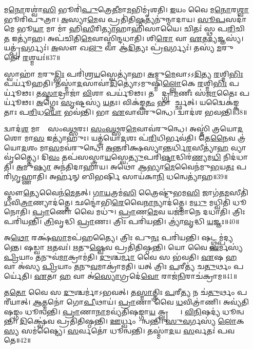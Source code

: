𑌮\ul{𑌨𑍋}𑌰𑌶𑍍𑌵𑌾॑\ul{𑌸𑌿} 𑌭𑍂𑌰𑌿॑\ul{𑌪𑍁}𑌤𑍍𑌰𑍇\ul{𑌤𑍀}𑌮𑌾\ul{𑌮}𑌭𑌿𑌮𑍃॑𑌶𑌤𑌿। 
\ul{𑌇}𑌯𑌂 𑌵𑍈 𑌮\ul{𑌨𑍋}𑌰\ul{𑌶𑍍𑌵𑌾} 𑌭𑍂𑌰𑌿॑𑌪𑍁𑌤𑍍𑌰𑌾। 
\ul{𑌅}𑌸𑍍𑌯𑌾\ul{𑌮𑍇}𑌵 𑌪𑍍𑌰𑌤𑌿॑𑌤𑌿\ul{𑌷𑍍𑌠}𑌤𑍍𑌯𑌨𑍁॑𑌨𑍍𑌮𑌾𑌦𑌾𑌯। 
\ul{𑌸𑍂}\ul{𑌪}𑌸𑌦𑌾॑ 𑌮𑍇 𑌭𑍂\ul{𑌯𑌾} 𑌮𑌾 𑌮𑌾॑ 𑌹𑌿\ul{𑌸𑍀}𑌰𑌿\ul{𑌤𑍍𑌯𑌾}𑌹𑌾𑌹𑌿॑𑌸𑌾𑌯𑍈। 
𑌚𑌿𑌤𑌃॑ 𑌸𑍍𑌥 𑌪\ul{𑌰𑌿}𑌚𑌿\ul{𑌤} 𑌇𑌤𑍍𑌯𑌾॑𑌹। 
𑌅𑌪॑𑌚𑌿𑌤𑌿\ul{𑌮𑍇}𑌵𑌾𑌸𑍍𑌮𑌿॑𑌨𑍍𑌦𑌧𑌾𑌤𑌿। 
𑌶𑌿\ul{𑌰𑍋} 𑌵𑌾 \ul{𑌏}𑌤\ul{𑌦𑍍𑌯}𑌜𑍍𑌞𑌸𑍍𑌯॑। 
𑌯𑌤𑍍𑌪𑍍𑌰॑\ul{𑌵}𑌰𑍍𑌗𑍍𑌯𑌃॑। 
\ul{𑌅}𑌸𑍗 𑌖\ul{𑌲𑍁} 𑌵𑌾 𑌆॑\ul{𑌦𑌿}𑌤𑍍𑌯𑌃 𑌪𑍍𑌰॑\ul{𑌵}𑌰𑍍𑌗𑍍𑌯𑌃॑। 
𑌤𑌸𑍍𑌯॑ \ul{𑌮}𑌰𑍁𑌤𑍋॑ \ul{𑌰}𑌶𑍍𑌮𑌯𑌃॑॥37॥

𑌸𑍍𑌵𑌾𑌹𑌾॑ \ul{𑌮}𑌰𑍁\ul{𑌦𑍍𑌭𑌿𑌃} 𑌪𑌰𑌿॑𑌶𑍍𑌰\ul{𑌯}𑌸𑍍𑌵𑍇𑌤𑍍𑌯𑌾॑𑌹। 
\ul{𑌅}𑌮𑍁\ul{𑌮𑍇}𑌵𑌾𑌽𑌽\ul{𑌦𑌿}𑌤𑍍𑌯 \ul{𑌰}𑌶𑍍𑌮𑌿\ul{𑌭𑌿𑌃} 𑌪𑌰𑍍𑌯𑍂॑𑌹𑌤𑌿। 
𑌤𑌸𑍍𑌮𑌾॑\ul{𑌦}𑌸𑌾𑌵𑌾॑\ul{𑌦𑌿}𑌤𑍍𑌯𑍋॑𑌽𑌮𑍁𑌷𑍍𑌮𑌿𑌁॑\ul{𑌲𑍍𑌲𑍋}𑌕𑍇 \ul{𑌰}𑌶𑍍𑌮𑌿\ul{𑌭𑌿𑌃} 𑌪𑌰𑍍𑌯𑍂॑𑌢𑌃। 
𑌤\ul{𑌸𑍍𑌮𑌾}𑌦𑍍𑌰𑌾𑌜𑌾॑ \ul{𑌵𑌿}𑌶𑌾 𑌪𑌰𑍍𑌯𑍂॑𑌢𑌃। 
𑌤𑌸𑍍𑌮𑌾᳚𑌦𑍍𑌗𑍍𑌰𑌾\ul{𑌮}𑌣𑍀𑌃 𑌸॑\ul{𑌜𑌾}𑌤𑍈𑌃 𑌪𑌰𑍍𑌯𑍂॑𑌢𑌃। 
\ul{𑌅}𑌗𑍍𑌨𑍇𑌃 \ul{𑌸𑍃}𑌷𑍍𑌟𑌸𑍍𑌯॑ \ul{𑌯}𑌤𑌃। 
𑌵𑌿𑌕॑𑌙𑍍𑌕\ul{𑌤𑌂} 𑌭𑌾 𑌆᳚𑌰𑍍𑌚𑍍𑌛𑌤𑍍। 
𑌯𑌦𑍍𑌵𑍈𑌕॑𑌙𑍍𑌕𑌤𑌾𑌃 𑌪\ul{𑌰𑌿}𑌧\ul{𑌯𑍋} 𑌭𑌵॑𑌨𑍍𑌤𑌿। 
𑌭𑌾 \ul{𑌏}𑌵𑌾𑌵॑𑌰𑍁𑌨𑍍𑌧𑍇। 
𑌦𑍍𑌵𑌾𑌦॑𑌶 𑌭𑌵𑌨𑍍𑌤𑌿॥38॥

𑌦𑍍𑌵𑌾𑌦॑\ul{𑌶} 𑌮𑌾𑌸𑌾𑌃᳚ 𑌸𑌂𑌵\ul{𑌥𑍍𑌸}𑌰𑌃। 
\ul{𑌸𑌂}\ul{𑌵}\ul{𑌥𑍍𑌸}𑌰\ul{𑌮𑍇}𑌵𑌾𑌵॑𑌰𑍁𑌨𑍍𑌧𑍇। 
𑌅𑌸𑍍𑌤𑌿॑ 𑌤𑍍𑌰𑌯𑍋\ul{𑌦}𑌶𑍋 𑌮𑌾\ul{𑌸} 𑌇𑌤𑍍𑌯𑌾॑𑌹𑍁𑌃। 
𑌯𑌤𑍍𑌤𑍍𑌰॑𑌯𑍋\ul{𑌦}𑌶𑌃 𑌪॑\ul{𑌰𑌿}𑌧𑌿𑌰𑍍𑌭𑌵॑𑌤𑌿। 
𑌤𑍇\ul{𑌨𑍈}𑌵 𑌤𑍍𑌰॑𑌯𑍋\ul{𑌦}𑌶𑌂 𑌮𑌾\ul{𑌸}𑌮𑌵॑𑌰𑍁𑌨𑍍𑌧𑍇। 
\ul{𑌅}𑌨𑍍𑌤𑌰𑌿॑𑌕𑍍𑌷𑌸𑍍𑌯𑌾\ul{𑌨𑍍𑌤}𑌰𑍍𑌧𑌿\ul{𑌰}𑌸𑍀𑌤𑍍𑌯𑌾॑\ul{𑌹} 𑌵𑍍𑌯𑌾𑌵𑍃॑𑌤𑍍𑌤𑍍𑌯𑍈। 
𑌦𑌿\ul{𑌵𑌂} 𑌤𑌪॑𑌸𑌸𑍍𑌤𑍍𑌰𑌾\ul{𑌯}𑌸𑍍𑌵𑍇\ul{𑌤𑍍𑌯𑍁}𑌪𑌰𑌿॑\ul{𑌷𑍍𑌟𑌾}𑌦𑍍𑌧𑌿𑌰॑\ul{𑌣𑍍𑌯}𑌮\ul{𑌧𑌿} 𑌨𑌿𑌦॑𑌧𑌾𑌤𑌿। 
\ul{𑌅}𑌮𑍁\ul{𑌷𑍍𑌯𑌾} 𑌅𑌨॑𑌤𑌿𑌦𑌾𑌹𑌾𑌯। 
𑌅𑌥𑍋॑ \ul{𑌆}𑌭𑍍𑌯𑌾\ul{𑌮𑍇}𑌵𑍈𑌨॑𑌮𑍁\ul{𑌭}𑌯\ul{𑌤𑌃} 𑌪𑌰𑌿॑𑌗𑍃𑌹𑍍𑌣𑌾𑌤𑌿। 
𑌅𑌰𑍍\mbox{}𑌹॑𑌨𑍍 𑌬𑌿𑌭𑌰𑍍\mbox{}\ul{𑌷𑌿} 𑌸𑌾𑌯॑𑌕𑌾\ul{𑌨𑌿} 𑌧𑌨𑍍𑌵𑍇𑌤𑍍𑌯𑌾॑𑌹॥39॥

𑌸𑍍𑌤𑍗\ul{𑌤𑍍𑌯𑍇}𑌵𑍈𑌨॑\ul{𑌮𑍇}𑌤𑌤𑍍। 
\ul{𑌗𑌾}\ul{𑌯}𑌤𑍍𑌰𑌮॑\ul{𑌸𑌿} 𑌤𑍍𑌰𑍈𑌷𑍍𑌟𑍁॑𑌭𑌮\ul{𑌸𑌿} 𑌜𑌾𑌗॑𑌤\ul{𑌮}𑌸𑍀𑌤𑌿॑ \ul{𑌧}𑌵𑌿\ul{𑌤𑍍𑌰𑌾}𑌣𑍍𑌯𑌾𑌦॑𑌤𑍍𑌤𑍇। 
𑌛𑌨𑍍𑌦𑍋॑𑌭𑌿\ul{𑌰𑍇}𑌵𑍈\ul{𑌨𑌾}𑌨𑍍𑌯𑌾𑌦॑𑌤𑍍𑌤𑍇। 
𑌮\ul{𑌧𑍁} 𑌮𑌧𑍍𑌵𑌿𑌤𑌿॑ 𑌧𑍂𑌨𑍋𑌤𑌿। 
\ul{𑌪𑍍𑌰𑌾}𑌣𑍋 𑌵𑍈 𑌮𑌧𑍁॑। 
\ul{𑌪𑍍𑌰𑌾}𑌣\ul{𑌮𑍇}𑌵 𑌯𑌜॑𑌮𑌾𑌨𑍇 𑌦𑌧𑌾𑌤𑌿। 
𑌤𑍍𑌰𑌿𑌃 𑌪𑌰𑌿॑𑌯𑌨𑍍𑌤𑌿। 
\ul{𑌤𑍍𑌰𑌿}𑌵𑍃𑌦𑍍𑌧𑌿 \ul{𑌪𑍍𑌰𑌾}𑌣𑌃। 
𑌤𑍍𑌰𑌿𑌃 𑌪𑌰𑌿॑𑌯𑌨𑍍𑌤𑌿। 
𑌤𑍍𑌰𑍍𑌯𑌾॑\ul{𑌵𑍃}𑌦𑍍𑌧𑌿 \ul{𑌯}𑌜𑍍𑌞𑌃॥40॥

𑌅\ul{𑌥𑍋} 𑌰𑌕𑍍𑌷॑\ul{𑌸𑌾}𑌮𑌪॑𑌹𑌤𑍍𑌯𑍈। 
𑌤𑍍𑌰𑌿𑌃 𑌪𑍁\ul{𑌨𑌃} 𑌪𑌰𑌿॑𑌯𑌨𑍍𑌤𑌿। 
𑌷𑌟𑍍𑌥𑍍𑌸𑌮𑍍𑌪॑𑌦𑍍𑌯𑌨𑍍𑌤𑍇। 
𑌷𑌡𑍍𑌵𑌾 \ul{𑌋}𑌤𑌵𑌃॑। 
\ul{𑌋}𑌤𑍁\ul{𑌷𑍍𑌵𑍇}𑌵 𑌪𑍍𑌰𑌤𑌿॑𑌤𑌿𑌷𑍍𑌠𑌨𑍍𑌤𑌿। 
𑌯𑍋 𑌵𑍈 \ul{𑌘}𑌰𑍍𑌮𑌸𑍍𑌯॑ \ul{𑌪𑍍𑌰𑌿}𑌯𑌾𑌂 \ul{𑌤}𑌨𑍁𑌵॑\ul{𑌮𑌾}𑌕𑍍𑌰𑌾𑌮॑𑌤𑌿। 
\ul{𑌦𑍁}𑌶𑍍𑌚\ul{𑌰𑍍𑌮𑌾} 𑌵𑍈 𑌸 𑌭॑𑌵𑌤𑌿। 
\ul{𑌏}𑌷 \ul{𑌹} 𑌵𑌾 𑌅॑𑌸𑍍𑌯 \ul{𑌪𑍍𑌰𑌿}𑌯𑌾𑌂 \ul{𑌤}𑌨𑍁\ul{𑌵}𑌮𑌾𑌕𑍍𑌰𑌾॑𑌮𑌤𑌿। 
𑌯𑌤𑍍 𑌤𑍍𑌰𑌿𑌃 \ul{𑌪}𑌰𑍀𑌤𑍍𑌯॑ 𑌚\ul{𑌤𑍁}𑌰𑍍𑌥𑌂 𑌪𑌰𑍍𑌯𑍇॑𑌤𑌿। 
\ul{𑌏}𑌤𑌾 \ul{𑌹} 𑌵𑌾 𑌅॑\ul{𑌸𑍍𑌯𑍋}𑌗𑍍𑌰𑌦𑍇॑\ul{𑌵𑍋} 𑌰𑌾𑌜॑\ul{𑌨𑌿}𑌰𑌾𑌚॑𑌕𑍍𑌰𑌾𑌮॥41॥

𑌤\ul{𑌤𑍋} 𑌵𑍈 𑌸 \ul{𑌦𑍁}𑌶𑍍𑌚𑌰𑍍𑌮𑌾॑𑌽𑌭𑌵𑌤𑍍। 
𑌤\ul{𑌸𑍍𑌮𑌾}𑌤𑍍𑌤𑍍𑌰𑌿𑌃 \ul{𑌪}𑌰𑍀\ul{𑌤𑍍𑌯} 𑌨 𑌚॑\ul{𑌤𑍁}𑌰𑍍𑌥𑌂 𑌪𑌰𑍀॑𑌯𑌾𑌤𑍍। 
\ul{𑌆}𑌤𑍍𑌮𑌨𑍋॑ 𑌗𑍋\ul{𑌪𑍀}𑌥𑌾𑌯॑। 
\ul{𑌪𑍍𑌰𑌾}𑌣𑌾 𑌵𑍈 \ul{𑌧}𑌵𑌿𑌤𑍍𑌰𑌾॑𑌣𑌿। 
𑌅𑌵𑍍𑌯॑𑌤𑌿𑌷𑌙𑍍𑌗𑌂 𑌧𑍂𑌨𑍍𑌵𑌨𑍍𑌤𑌿। 
\ul{𑌪𑍍𑌰𑌾}𑌣𑌾\ul{𑌨𑌾}𑌮𑌵𑍍𑌯॑𑌤𑌿𑌷𑌙𑍍𑌗𑌾\ul{𑌯} 𑌕𑍍𑌲𑍃𑌪𑍍𑌤𑍍𑌯𑍈᳚। 
\ul{𑌵𑌿}\ul{𑌨𑌿}𑌷𑌦𑍍𑌯॑ 𑌧𑍂𑌨𑍍𑌵𑌨𑍍𑌤𑌿। 
\ul{𑌦𑌿}𑌕𑍍𑌷𑍍𑌵𑍇॑𑌵 𑌪𑍍𑌰𑌤𑌿॑𑌤𑌿𑌷𑍍𑌠𑌨𑍍𑌤𑌿। 
\ul{𑌊}𑌰𑍍𑌧𑍍𑌵𑌂 𑌧𑍂᳚𑌨𑍍𑌵𑌨𑍍𑌤𑌿। 
\ul{𑌸𑍁}\ul{𑌵}𑌰𑍍𑌗𑌸𑍍𑌯॑ \ul{𑌲𑍋}𑌕\ul{𑌸𑍍𑌯} 𑌸𑌮॑𑌷𑍍𑌟𑍍𑌯𑍈। 
\ul{𑌸}𑌰𑍍𑌵𑌤𑍋॑ 𑌧𑍂𑌨𑍍𑌵𑌨𑍍𑌤𑌿। 
𑌤𑌸𑍍𑌮𑌾॑\ul{𑌦}𑌯 \ul{𑌸}𑌰𑍍𑌵𑌤𑌃॑ 𑌪𑌵𑌤𑍇॥42॥
\anuvakamend[\ul{𑌦}\ul{𑌧𑌾}\ul{𑌤𑍀}𑌵𑌾𑌨𑍍𑌵𑌾॑𑌹 \ul{𑌯}𑌜𑍍𑌞𑌸𑍍𑌯𑌾॑\ul{𑌹𑍈}𑌷 \ul{𑌉}𑌪𑌰𑌿॑𑌷𑍍𑌟𑌾𑌦𑌾𑌶𑍀\ul{𑌰}𑌨𑍍𑌯𑍋 𑌵𑍍𑌯𑌾᳚\ul{𑌸𑍍𑌥𑌾}𑌪𑌯॑𑌨𑍍𑌤𑌿 \ul{𑌰}𑌶𑍍𑌮𑌯𑍋॑ 𑌭𑌵\ul{𑌨𑍍𑌤𑌿} 𑌧𑌨𑍍𑌵𑍇𑌤𑍍𑌯𑌾॑𑌹 \ul{𑌯}𑌜𑍍𑌞𑌶𑍍𑌚॑𑌕𑍍𑌰𑌾\ul{𑌮} 𑌸𑌮॑\ul{𑌷𑍍𑌟𑍍𑌯𑍈} 𑌦𑍍𑌵𑍇 𑌚॑]

